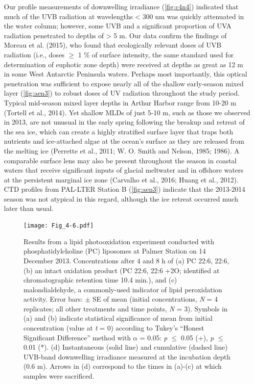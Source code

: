 Our profile measurements of downwelling irradiance (\autoref{fig:c4n4}) indicated that much of the UVB radiation at wavelengths \textless{} 300 nm was quickly attenuated in the water column; however, some UVB and a significant proportion of UVA radiation penetrated to depths of \textgreater{} 5 m. Our data confirm the findings of Moreau et al. (2015), who found that ecologically relevant doses of UVB radiation (i.e., doses $\geq$ 1 \% of surface intensity, the same standard used for determination of euphotic zone depth) were received at depths as great as 12 m in some West Antarctic Peninsula waters. Perhaps most importantly, this optical penetration was sufficient to expose nearly all of the shallow early-season mixed layer (\autoref{fig:aen3}) to robust doses of UV radiation throughout the study period. Typical mid-season mixed layer depths in Arthur Harbor range from 10-20 m (Tortell et al., 2014). Yet shallow MLDs of just 5-10 m, such as those we observed in 2013, are not unusual in the early spring following the breakup and retreat of the sea ice, which can create a highly stratified surface layer that traps both nutrients and ice-attached algae at the ocean's surface as they are released from the melting ice (Perrette et al., 2011; W. O. Smith and Nelson, 1985; 1986). A comparable surface lens may also be present throughout the season in coastal waters that receive significant inputs of glacial meltwater and in offshore waters at the persistent marginal ice zone (Carvalho et al., 2016; Huang et al., 2012). CTD profiles from PAL-LTER Station B (\autoref{fig:aen3}) indicate that the 2013-2014 season was not atypical in this regard, although the ice retreat occurred much later than usual.
\begin{figure}
\centering
\texttt{[image: Fig\_4-6.pdf]}
\caption[Results from a lipid photooxidation experiment conducted with phosphatidylcholine (PC) liposomes]{Results from a lipid photooxidation experiment conducted with phosphatidylcholine (PC) liposomes at Palmer Station on 14 December 2013. Concentrations after 4 and 8 h of (a) PC 22:6, 22:6, (b) an intact oxidation product (PC 22:6, 22:6 +2O; identified at chromatographic retention time 10.4 min.), and (c) malondialdehyde, a commonly-used indicator of lipid peroxidation activity. Error bars: $\pm$ SE of mean (initial concentrations, \emph{N} = 4 replicates; all other treatments and time points, \emph{N} = 3). Symbols in (a) and (b) indicate statistical significance of mean from initial concentration (value at \emph{t} = 0) according to Tukey's ``Honest Significant Difference'' method with $\alpha$ = 0.05: \emph{p} $\leq$ 0.05 (+), \emph{p} $\leq$ 0.01 (*). (d) Instantaneous (solid line) and cumulative (dashed line) UVB-band downwelling irradiance measured at the incubation depth (0.6 m). Arrows in (d) correspond to the times in (a)-(c) at which samples were sacrificed.}
\label{fig:c4n6}
\end{figure}

